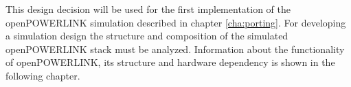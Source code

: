 This design decision will be used for the first implementation of the openPOWERLINK simulation described in chapter \ref{cha:porting}.
For developing a simulation design the structure and composition of the simulated openPOWERLINK stack must be analyzed.
Information about the functionality of openPOWERLINK, its structure and hardware dependency is shown in the following chapter.